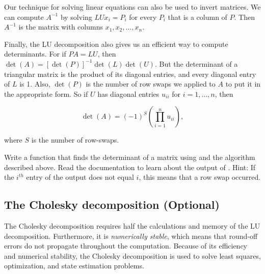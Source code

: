 Our technique for solving linear equations can also be used to invert matrices. 
We can compute $A^{-1}$ by solving $LUx_i = P_i$ for every $P_i$ that is a column of $P$. 
Then $A^{-1}$ is the matrix with columns $x_1, x_2, \ldots, x_n$. 

Finally, the LU decomposition also gives us an efficient way to compute determinants. 
For if $PA=LU$, then $\det(A) = [\det(P)]^{-1}\det(L)\det(U)$. 
But the determinant of a triangular matrix is the product of its diagonal entries, and every diagonal entry of $L$ is 1. 
Also, $\det(P)$ is the number of row swaps we applied to $A$ to put it in the appropriate form. 
So if $U$ has diagonal entries $u_{ii}$ for $i=1, \ldots, n$, then

\[
\det(A) = (-1)^S\left(\displaystyle\prod_{i=1}^nu_{ii}\right),
\]

where $S$ is the number of row-swaps.



%

\begin{problem}[Optional]
\label{prob:det}
Write a function that finds the determinant of a matrix using  and the algorithm described above. 
Read the documentation to learn about the output of .
Hint: If the $i^{th}$ entry of the output  does not equal $i$, this means that a row swap occurred.
\end{problem}

\subsection*{The Cholesky decomposition (Optional)}
The Cholesky decomposition requires half the calculations and memory of the LU decomposition. 
Furthermore, it is \emph{numerically stable}, which means that round-off errors do not propagate throughout the computation. 
Because of its efficiency and numerical stability, the Cholesky decomposition is used to solve least squares, optimization, and state estimation problems.

